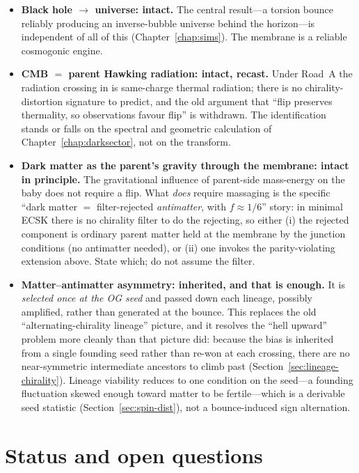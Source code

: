 \begin{itemize}
  \item \textbf{Black hole $\to$ universe: intact.} The central result---a torsion
    bounce reliably producing an inverse-bubble universe behind the horizon---is
    independent of all of this (Chapter~\ref{chap:sims}). The membrane is a
    reliable cosmogonic engine.
  \item \textbf{CMB $=$ parent Hawking radiation: intact, recast.} Under Road~A the
    radiation crossing in is same-charge thermal radiation; there is no
    chirality-distortion signature to predict, and the old argument that ``flip
    preserves thermality, so observations favour flip'' is withdrawn. The
    identification stands or falls on the spectral and geometric calculation of
    Chapter~\ref{chap:darksector}, not on the transform.
  \item \textbf{Dark matter as the parent's gravity through the membrane: intact in
    principle.} The gravitational influence of parent-side mass-energy on the
    baby does not require a flip. What \emph{does} require massaging is the
    specific ``dark matter $=$ filter-rejected \emph{antimatter}, with
    $f\approx1/6$'' story: in minimal ECSK there is no chirality filter to do the
    rejecting, so either (i) the rejected component is ordinary parent matter held
    at the membrane by the junction conditions (no antimatter needed), or (ii)
    one invokes the parity-violating extension above. State which; do not assume
    the filter.
  \item \textbf{Matter--antimatter asymmetry: inherited, and that is enough.} It is
    \emph{selected once at the OG seed} and passed down each lineage, possibly
    amplified, rather than generated at the bounce. This replaces the old
    ``alternating-chirality lineage'' picture, and it resolves the ``hell upward''
    problem more cleanly than that picture did: because the bias is inherited from
    a single founding seed rather than re-won at each crossing, there are no
    near-symmetric intermediate ancestors to climb past (Section~\ref{sec:lineage-chirality}).
    Lineage viability reduces to one condition on the seed---a founding
    fluctuation skewed enough toward matter to be fertile---which is a derivable
    seed statistic (Section~\ref{sec:spin-dist}), not a bounce-induced sign
    alternation.
\end{itemize}

\section{Status and open questions}

